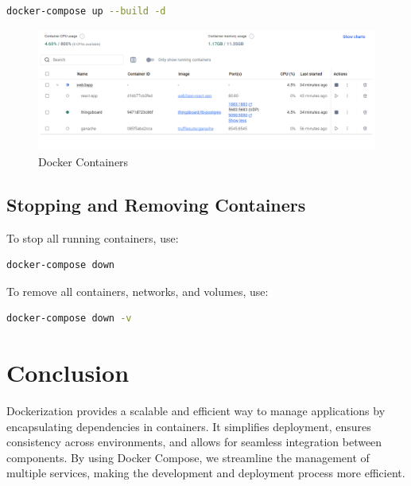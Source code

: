 \documentclass[a4paper,12pt]{report}
\begin{document}
\begin{lstlisting}[language=bash]
docker-compose up --build -d
\end{lstlisting}
\begin{figure}[H]
    \centering
    \includegraphics[width=1\textwidth]{docker container.PNG}
    \caption{Docker Containers}
    \end{figure}

\subsection{Stopping and Removing Containers}

To stop all running containers, use:

\begin{lstlisting}[language=bash]
docker-compose down
\end{lstlisting}

To remove all containers, networks, and volumes, use:

\begin{lstlisting}[language=bash]
docker-compose down -v
\end{lstlisting}

\section{Conclusion}

Dockerization provides a scalable and efficient way to manage applications by encapsulating dependencies in containers. It simplifies deployment, ensures consistency across environments, and allows for seamless integration between components. By using Docker Compose, we streamline the management of multiple services, making the development and deployment process more efficient.
\end{document}
